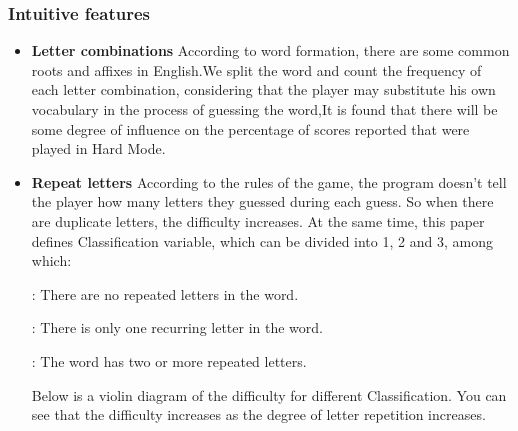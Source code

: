 \documentclass{mcmthesis}
\begin{document}
\subsubsection{Intuitive features}
\begin{itemize}
\item \textbf{Letter combinations} According to word formation, there are some common roots and affixes in English.We split the word and count the frequency of each letter combination, considering that the player may substitute his own vocabulary in the process of guessing the word,It is found that there will be some degree of influence on the percentage of scores reported that were played in Hard Mode.
\item \textbf{Repeat letters} According to the rules of the game, the program doesn't tell the player how many letters they guessed during each guess. So when there are duplicate letters, the difficulty increases. At the same time, this paper defines Classification variable, which can be divided into 1, 2 and 3, among which:

: There are no repeated letters in the word.

: There is only one recurring letter in the word.

: The word has two or more repeated letters.

\qquad Below is a violin diagram of the difficulty for different Classification. You can see that the difficulty increases as the degree of letter repetition increases.
\end{itemize}
\end{document}
